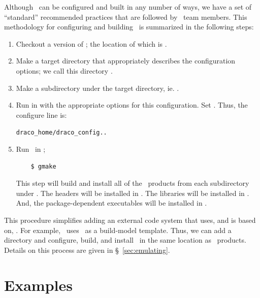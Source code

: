 Although \draco\ can be configured and built in any number of ways, we 
have a set of ``standard'' recommended practices that are followed by
\draco\ team members.  This methodology for configuring and
building \draco\ is summarized in the following steps:
\begin{enumerate}
\item Checkout a version of \draco; the location of which is
  \dracohome.
\item Make a target directory that appropriately describes the
  configuration options; we call this directory .
\item Make a  subdirectory under the target directory,
  ie. .
\item Run \dracohome{} in
   with the appropriate options for this
  configuration.  Set . Thus, the
  configure line is:
  \begin{alltt}
    $ $draco_home/draco_config .. 
  \end{alltt}
\item Run \gmake\ in ;
\begin{verbatim}
    $ gmake
\end{verbatim} %
  This step will build and install all of the \draco\ products from
  each subdirectory under .  The headers
  will be installed in .  The libraries
  will be installed in . And, the
  package-dependent executables will be installed in
  .
\end{enumerate}
This procedure simplifies adding an external code system that uses,
and is based on, \draco.  For example, \solon\ uses \draco\ as a
build-model template.  Thus, we can add a 
directory and configure, build, and install \solon\ in the same
location as \draco\ products.  Details on this process are given in
\S~\ref{sec:emulating}. 


\section{Examples}
\label{sec:examples}

